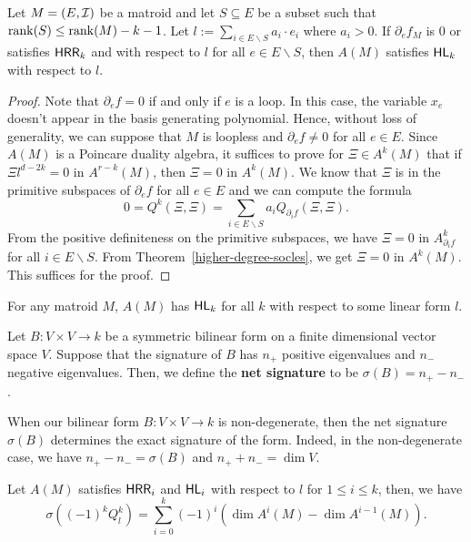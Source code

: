 \documentclass{puthesis-UG}
\begin{document}
\begin{thm}
	Let $M = (E, \mathcal{I})$ be a matroid and let $S \subseteq E$ be a subset such that $\operatorname{rank} (S) \leq \operatorname{rank} (M) - k - 1$. Let $l := \sum_{i \in E \backslash S} a_i \cdot e_i$ where $a_i > 0$. If $\partial_e f_M$ is $0$ or satisfies $\mathsf{HRR}_k$ and with respect to $l$ for all $e \in E \backslash S$, then $A(M)$ satisfies $\mathsf{HL}_k$ with respect to $l$. 
\end{thm}

\begin{proof}
	Note that $\partial_e f = 0$ if and only if $e$ is a loop. In this case, the variable $x_e$ doesn't appear in the basis generating polynomial. Hence, without loss of generality, we can suppose that $M$ is loopless and $\partial_e f \neq 0$ for all $e \in E$. Since $A(M)$ is a Poincare duality algebra, it suffices to prove for $\Xi \in A^k(M)$ that if $\Xi l^{d-2k} = 0$ in $A^{r-k}(M)$, then $\Xi = 0$ in $A^k(M)$. We know that $\Xi$ is in the primitive subspaces of $\partial_e f$ for all $e \in E$ and we can compute the formula
	\[
		0 = Q^k (\Xi, \Xi) = \sum_{i \in E \backslash S} a_i Q_{\partial_i f} (\Xi, \Xi).
	\]
	From the positive definiteness on the primitive subspaces, we have $\Xi = 0$ in $A^k_{\partial_i f}$ for all $i \in E\backslash S$. From Theorem~\ref{higher-degree-socles}, we get $\Xi = 0$ in $A^k(M)$. This suffices for the proof. 
\end{proof}

\begin{conj}
	For any matroid $M$, $A (M)$ has $\mathsf{HL}_k$ for all $k$ with respect to some linear form $l$. 
\end{conj}
\begin{defn}
	Let $B : V \times V \to k$ be a symmetric bilinear form on a finite dimensional vector space $V$. Suppose that the signature of $B$ has $n_+$ positive eigenvalues and $n_-$ negative eigenvalues. Then, we define the \textbf{net signature} to be $\sigma(B) = n_+ - n_-$. 
\end{defn}

When our bilinear form $B : V \times V \to k$ is non-degenerate, then the net signature $\sigma (B)$ determines the exact signature of the form. Indeed, in the non-degenerate case, we have $n_+ - n_- = \sigma(B)$ and $n_+ + n_- = \dim V$. 
\begin{lem} \label{formula-for-dimension-when-HRR-HL-are-satisfied}
	Let $A(M)$ satisfies $\mathsf{HRR}_i$ and $\mathsf{HL}_i$ with respect to $l$ for $1 \leq i \leq k$, then, we have 
	\[
		\sigma \left ( (-1)^kQ_l^k \right ) = \sum_{i = 0}^k (-1)^i (\dim A^i(M) - \dim A^{i-1}(M)).
	\]
\end{lem}
\end{document}
